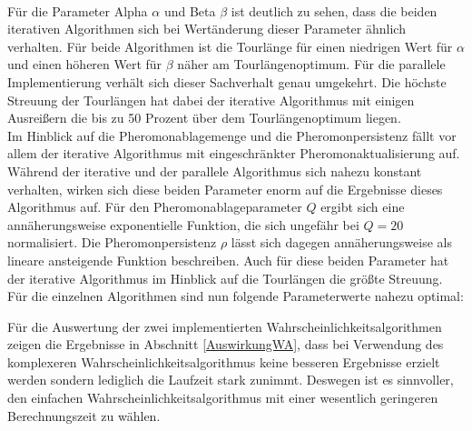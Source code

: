\documentclass[doktyp=barbeit, sprache=german]{TUBAFarbeiten}
\begin{document}
\\Für die Parameter Alpha $\alpha$ und Beta $\beta$ ist deutlich zu sehen, dass die beiden iterativen Algorithmen sich bei Wertänderung dieser Parameter ähnlich verhalten. Für beide Algorithmen ist die Tourlänge für einen niedrigen Wert für $\alpha$ und einen höheren Wert für $\beta$ näher am Tourlängenoptimum. Für die parallele Implementierung verhält sich dieser Sachverhalt genau umgekehrt. Die höchste Streuung der Tourlängen hat dabei der iterative Algorithmus mit einigen Ausreißern die bis zu 50 Prozent über dem Tourlängenoptimum liegen.
\\Im Hinblick auf die Pheromonablagemenge und die Pheromonpersistenz fällt vor allem der iterative Algorithmus mit eingeschränkter Pheromonaktualisierung auf. Während der iterative und der parallele Algorithmus sich nahezu konstant verhalten, wirken sich diese beiden Parameter enorm auf die Ergebnisse dieses Algorithmus auf. Für den Pheromonablageparameter $Q$ ergibt sich eine annäherungsweise exponentielle Funktion, die sich ungefähr bei $Q = 20$ normalisiert. Die Pheromonpersistenz $\rho$ lässt sich dagegen annäherungsweise als lineare ansteigende Funktion beschreiben. Auch für diese beiden Parameter hat der iterative Algorithmus im Hinblick auf die Tourlängen die größte Streuung.
\\Für die einzelnen Algorithmen sind nun folgende Parameterwerte nahezu optimal:
\begin{table}[]
\centering
{}
\captionsetup{justification=centering}
\caption{Übersicht der Parameterwerte, die bei dem jeweiligen Algorithmus zu den besten Ergebnissen im Hinblick auf eine kurze Tourlänge führen}
\label{tableParameterOptimum}
\end{table}
Für die Auswertung der zwei implementierten Wahrscheinlichkeitsalgorithmen zeigen die Ergebnisse in Abschnitt \ref{AuswirkungWA}, dass bei Verwendung des komplexeren Wahrscheinlichkeitsalgorithmus keine besseren Ergebnisse erzielt werden sondern lediglich die Laufzeit stark zunimmt. Deswegen ist es sinnvoller, den einfachen Wahrscheinlichkeitsalgorithmus mit einer wesentlich geringeren Berechnungszeit zu wählen.
\end{document}
